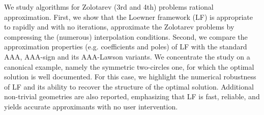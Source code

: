 We study algorithms for Zolotarev (3rd and 4th) problems rational approximation. First, we show that the Loewner framework (LF) is appropriate to rapidly and with no iterations, approximate the Zolotarev problems by compressing the (numerous) interpolation conditions. Second, we compare the approximation properties (e.g. coefficients and poles) of LF with the standard AAA, AAA-sign and its AAA-Lawson variants. We concentrate the study on a canonical example, namely the symmetric two-circles one, for which the optimal solution is well documented. For this case, we highlight the numerical robustness of LF and its ability to recover the structure of the optimal solution. Additional non-trivial geometries are also reported, emphasizing that LF is fast, reliable, and yields accurate approximants with no user intervention. 
